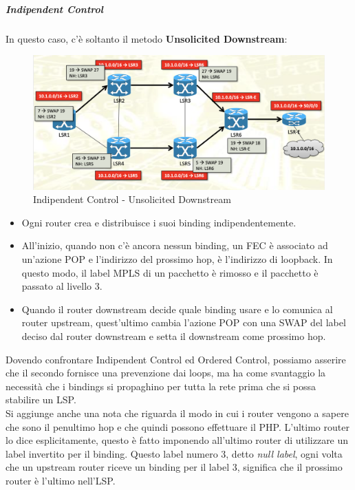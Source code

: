 \documentclass{article}
\begin{document}
\subparagraph{Indipendent Control}
In questo caso, c'è soltanto il metodo \textbf{Unsolicited Downstream}:
\begin{figure}[H]
    \centering
    \includegraphics[scale=0.3]{figures/indipendent control.png}
    \caption{Indipendent Control - Unsolicited Downstream}
\end{figure}
\begin{itemize}
    \item Ogni router crea e distribuisce i suoi binding indipendentemente.
    \item All'inizio, quando non c'è ancora nessun binding, un FEC è associato ad un'azione POP e l'indirizzo del prossimo hop, è l'indirizzo di loopback. In questo modo, il label MPLS di un pacchetto è rimosso e il pacchetto è passato al livello 3.
    \item Quando il router downstream decide quale binding usare e lo comunica al router upstream, quest'ultimo cambia l'azione POP con una SWAP del label deciso dal router downstream e setta il downstream come prossimo hop.
\end{itemize}
Dovendo confrontare Indipendent Control ed Ordered Control, possiamo asserire che il secondo fornisce una prevenzione dai loops, ma ha come svantaggio la necessità che i bindings si propaghino per tutta la rete prima che si possa stabilire un LSP. 
\\
Si aggiunge anche una nota che riguarda il modo in cui i router vengono a sapere che sono il penultimo hop e che quindi possono effettuare il PHP. L'ultimo router lo dice esplicitamente, questo è fatto imponendo all'ultimo router di utilizzare un label invertito per il binding. Questo label numero 3, detto \textit{null label}, ogni volta che un upstream router riceve un binding per il label 3, significa che il prossimo router è l'ultimo nell'LSP. 
\end{document}
